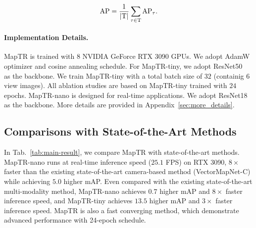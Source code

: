\documentclass{article} \usepackage{iclr2023_conference,times}
\begin{document}
\begin{equation}
\rm{AP} = \frac{1}{|T|} \sum_{\tau \in T} \rm{AP}_{\tau}.
\end{equation}



\paragraph{Implementation Details.}
MapTR is trained with $8$ NVIDIA GeForce RTX 3090 GPUs.
We adopt AdamW \citep{adamw} optimizer and cosine annealing schedule. 
For MapTR-tiny, we adopt ResNet50~\citep{resnet} as the backbone. We train MapTR-tiny with a total batch size of $32$ (containig 6 view images). All ablation studies are based on MapTR-tiny trained with $24$ epochs. MapTR-nano is designed for real-time applications.  We adopt ResNet18 as the backbone. More details are provided in Appendix~\ref{sec:more_details}.



\subsection{Comparisons with State-of-the-Art Methods}
In Tab.~\ref{tab:main-result}, we compare MapTR with state-of-the-art methods. 
MapTR-nano runs at real-time inference speed ($25.1$ FPS) on RTX 3090, $8\times$ faster than the existing state-of-the-art camera-based method (VectorMapNet-C) while achieving $5.0$ higher mAP. 
Even compared with the existing state-of-the-art multi-modality method, MapTR-nano achieves $0.7$ higher mAP and $8\times$ faster inference speed, and MapTR-tiny achieves $13.5$ higher mAP and $3\times$ faster inference speed. MapTR is also a fast converging method, which demonstrate advanced performance with 24-epoch schedule.
\end{document}
